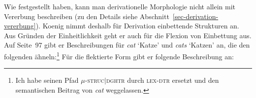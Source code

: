 Wie 
\citet{KN93a} festgestellt haben, kann man derivationelle Morphologie nicht allein mit Vererbung
beschreiben (zu den Details siehe Abschnitt~\ref{sec-derivation-vererbung}). Koenig nimmt deshalb
für Derivation einbettende Strukturen an. Aus Gründen der Einheitlichkeit geht er auch für die
Flexion von Einbettung aus.
Auf Seite~97 gibt er Beschreibungen für \emph{cat} `Katze' und \emph{cats} `Katzen' an, die den folgenden ähneln:\footnote{
  Ich habe seinen Pfad \textsc{$\mu$-struc$|$dghtr} durch \textsc{lex-dtr} ersetzt und den semantischen
  Beitrag von \emph{cat} weg\-ge\-lassen.%
}
\eal
\ex 
{}
\ex
{}
\zl
Für die flektierte Form gibt er folgende Beschreibung an:
\ea
{} 
\z
                
